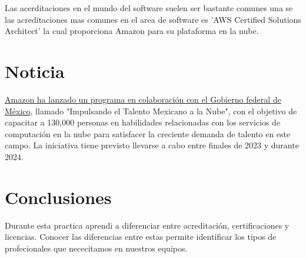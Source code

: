 \documentclass[11pt]{article}
\begin{document}
Las acerditaciones en el mundo del software suelen ser bastante
comunes una se las acreditaciones mas comunes en el area de software
es 'AWS Certified Solutions Architect' la cual proporciona Amazon para
su plataforma en la nube.

\section{Noticia}
\label{sec:orga072d4b}
\href{https://www.eleconomista.com.mx/empresas/Amazon-capacitara-a-130000-mexicanos-en-computacion-en-la-nube-20231106-0052.html}{Amazon ha lanzado un programa en colaboración con el Gobierno federal
de México}, llamado "Impulsando el Talento Mexicano a la Nube", con el 
objetivo de capacitar a 130,000 personas en habilidades relacionadas
con los servicios de computación en la nube para satisfacer la
creciente demanda de talento en este campo. La iniciativa tiene
previsto llevarse a cabo entre finales de 2023 y durante 2024. 

\section{Conclusiones}
\label{sec:orgd59173b}
Durante esta practica aprendi a diferenciar entre acreditación,
certificaciones y licencias. Conocer las diferencias entre estas
permite identificar los tipos de profecionales que nececitamos en
nuestros equipos.
\end{document}
